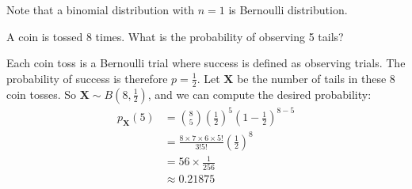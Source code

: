 Note that a binomial distribution with \( n = 1 \) is Bernoulli distribution.

\begin{exmp}
    A coin is tossed 8 times. What is the probability of observing 5 tails?
\end{exmp}
\begin{solution}
    Each coin toss is a Bernoulli trial where success is defined as observing trials.
    The probability of success is therefore \( p = \frac{1}{2} \).
    Let \( \bm{X} \) be the number of tails in these 8 coin tosses.
    So \( \bm{X} \sim B(8, \frac{1}{2}) \), and we can compute the desired probability:
    \begin{align*}
        p_{\bm{X}}(5) &= \binom{8}{5} (\frac{1}{2})^5 (1 - \frac{1}{2})^{8 - 5}\\
        &= \frac{8 \times 7 \times 6 \times 5!}{3!5!} (\frac{1}{2})^8\\
        &= 56 \times \frac{1}{256}\\
        &\approx 0.21875
    \end{align*}
\end{solution}

